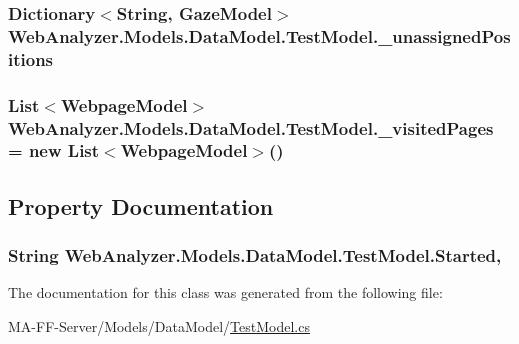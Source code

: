 \subsubsection[{\+\_\+unassigned\+Positions}]{\setlength{\rightskip}{0pt plus 5cm}Dictionary$<$String, {\bf Gaze\+Model}$>$ Web\+Analyzer.\+Models.\+Data\+Model.\+Test\+Model.\+\_\+unassigned\+Positions\hspace{0.3cm}{\ttfamily [private]}}\label{class_web_analyzer_1_1_models_1_1_data_model_1_1_test_model_a1eaf774e73692913671ff3cb85f5772e}
\hypertarget{class_web_analyzer_1_1_models_1_1_data_model_1_1_test_model_a849d23a83d37ac0e965c3946d8085aa2}{}
\subsubsection[{\+\_\+visited\+Pages}]{\setlength{\rightskip}{0pt plus 5cm}List$<${\bf Webpage\+Model}$>$ Web\+Analyzer.\+Models.\+Data\+Model.\+Test\+Model.\+\_\+visited\+Pages = new List$<${\bf Webpage\+Model}$>$()\hspace{0.3cm}{\ttfamily [private]}}\label{class_web_analyzer_1_1_models_1_1_data_model_1_1_test_model_a849d23a83d37ac0e965c3946d8085aa2}


\subsection{Property Documentation}
\hypertarget{class_web_analyzer_1_1_models_1_1_data_model_1_1_test_model_acdb09845b9c3bc8582f78d2729524216}{}
\subsubsection[{Started}]{\setlength{\rightskip}{0pt plus 5cm}String Web\+Analyzer.\+Models.\+Data\+Model.\+Test\+Model.\+Started\hspace{0.3cm}{\ttfamily [get]}, {\ttfamily [set]}}\label{class_web_analyzer_1_1_models_1_1_data_model_1_1_test_model_acdb09845b9c3bc8582f78d2729524216}


The documentation for this class was generated from the following file\+:\begin{DoxyCompactItemize}
\item 
M\+A-\/\+F\+F-\/\+Server/\+Models/\+Data\+Model/\hyperlink{_test_model_8cs}{Test\+Model.\+cs}\end{DoxyCompactItemize}
